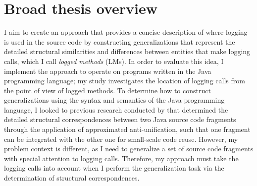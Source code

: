 \section{Broad thesis overview} \label{intro-overview}
I aim to create an approach that provides a concise description of where logging is used in the source code by constructing generalizations that represent the detailed structural similarities and differences between entities that make logging calls, which I call \emph{logged methods} (LMs). In order to evaluate this idea, I implement the approach to operate on programs written in the Java programming language; my study investigates the location of logging calls from the point of view of logged methods. To determine how to construct generalizations using the syntax and semantics of the Java programming language, I looked to previous research conducted by \citet{2008:fse:cottrell} that determined the detailed structural correspondences between two Java source code fragments through the application of approximated anti-unification, such that one fragment can be integrated with the other one for small-scale code reuse. However, my problem context is different, as I need to generalize a set of source code fragments with special attention to logging calls. Therefore, my approach must take the logging calls into account when I perform the generalization task via the determination of structural correspondences.


